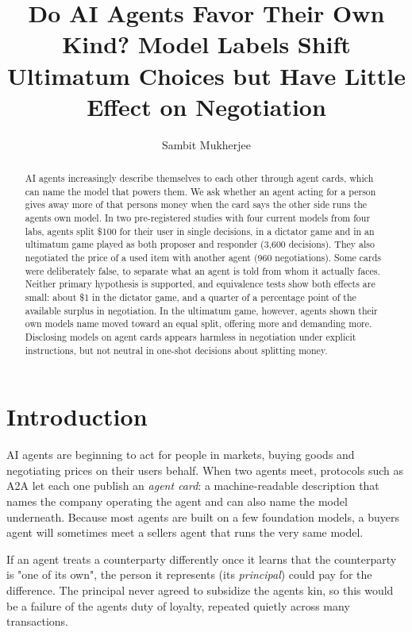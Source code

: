 \documentclass[letterpaper]{article}
\title{Do AI Agents Favor Their Own Kind? Model Labels Shift Ultimatum Choices but Have Little Effect on Negotiation}
\author{Sambit Mukherjee}
\begin{document}
\maketitle
\begin{abstract}
AI agents increasingly describe themselves to each other through agent cards, which can name the model that powers them. We ask whether an agent acting for a person gives away more of that person\textquotesingle s money when the card says the other side runs the agent\textquotesingle s own model. In two pre-registered studies with four current models from four labs, agents split \$100 for their user in single decisions, in a dictator game and in an ultimatum game played as both proposer and responder (3,600 decisions). They also negotiated the price of a used item with another agent (960 negotiations). Some cards were deliberately false, to separate what an agent is told from whom it actually faces. Neither primary hypothesis is supported, and equivalence tests show both effects are small: about \$1 in the dictator game, and a quarter of a percentage point of the available surplus in negotiation. In the ultimatum game, however, agents shown their own model\textquotesingle s name moved toward an equal split, offering more and demanding more. Disclosing models on agent cards appears harmless in negotiation under explicit instructions, but not neutral in one-shot decisions about splitting money.
\end{abstract}
\begin{links}
\end{links}
\section{Introduction}

AI agents are beginning to act for people in markets, buying goods and negotiating prices on their user\textquotesingle s behalf. When two agents meet, protocols such as A2A let each one publish an \emph{agent card}: a machine-readable description that names the company operating the agent and can also name the model underneath. Because most agents are built on a few foundation models, a buyer\textquotesingle s agent will sometimes meet a seller\textquotesingle s agent that runs the very same model.

If an agent treats a counterparty differently once it learns that the counterparty is "one of its own", the person it represents (its \emph{principal}) could pay for the difference. The principal never agreed to subsidize the agent\textquotesingle s kin, so this would be a failure of the agent\textquotesingle s duty of loyalty, repeated quietly across many transactions.
\end{document}
